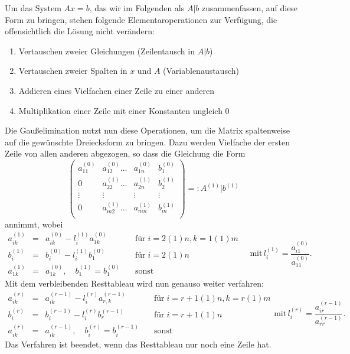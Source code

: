 Um das System $Ax=b$, das wir im Folgenden als $A|b$ zusammenfassen,
auf diese Form zu bringen, stehen folgende Elementaroperationen zur
Verfügung, die offensichtlich die Lösung nicht verändern:
\begin{enumerate}[beginpenalty=10000]
\item Vertauschen zweier Gleichungen (Zeilentausch in $A|b$)
\item Vertauschen zweier Spalten in $x$ und $A$ (Variablenaustausch)
\item Addieren eines Vielfachen einer Zeile zu einer anderen
\item Multiplikation einer Zeile mit einer Konstanten ungleich 0
\end{enumerate}
Die Gaußelimination nutzt nun diese Operationen, um die Matrix
spaltenweise auf die gewünschte Dreiecksform zu bringen. Dazu werden
Vielfache der ersten Zeile von allen anderen abgezogen, so dass die
Gleichung die Form
\begin{equation}
  \left(\begin{array}{lll|c}
      a_{11}^{(0)} & a_{12}^{(0)}\ldots &a_{1n}^{(0)} & b_1^{(0)}\\
      0     & a_{22}^{(1)}\ldots &a_{2n}^{(1)} & b_2^{(1)}\\
      \vdots& \vdots      &\vdots& \vdots\\
      0     & a_{m2}^{(1)}\ldots &a_{mn}^{(1)} & b_m^{(1)}\\
    \end{array}\right) =: A^{(1)} | b^{(1)}
\end{equation}
annimmt, wobei
\begin{equation}
  \begin{array}{rcll}
    a_{ik}^{(1)} &=& a_{ik}^{(0)} -  l_{i}^{(1)}a_{1k}^{(0)}
    & \quad\text{für}\; i=2(1)n, k=1(1)m\\[0.3em]
    b_{i}^{(1)} &=& b_{i}^{(0)} - l_{i}^{(1)} b_{1}^{(0)}
    & \quad\text{für}\; i=2(1)n \\[0.3em]
    a_{1k}^{(1)} &=& a_{1k}^{(0)},\quad b_{1}^{(1)} = b_{1}^{(0)}
    & \quad\text{sonst}
  \end{array}
  \quad\text{mit}\, l_{i}^{(1)} = \frac{a_{i1}^{(0)}}{a_{11}^{(0)}}.
\end{equation}
Mit dem verbleibenden Resttableau wird nun
genauso weiter verfahren:
\begin{equation}
  \label{eq:gausseli}
  \begin{array}{rcll}
    a_{ik}^{(r)} &=& a_{ik}^{(r-1)} -  l_{i}^{(r)}a_{r,k}^{(r-1)}
    & \quad\text{für}\; i=r+1(1)n, k=r(1)m\\[0.3em]
    b_{i}^{(r)} &=& b_{i}^{(r-1)} - l_{i}^{(r)} b_{r}^{(r-1)}
    & \quad\text{für}\; i=r+1(1)n \\[0.3em]
    a_{ik}^{(r)} &=& a_{ik}^{(r-1)},\quad b_{i}^{(r)} = b_{i}^{(r-1)}
    & \quad\text{sonst}
  \end{array}
  \text{mit}\, l_{i}^{(r)} = \frac{a_{ir}^{(r-1)}}{a_{rr}^{(r-1)}}.
\end{equation}
Das Verfahren ist beendet, wenn das Resttableau nur noch eine Zeile hat.

